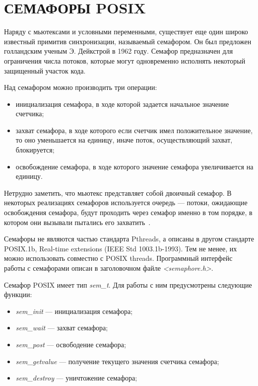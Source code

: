 \section[Семафоры POSIX]{СЕМАФОРЫ POSIX}

Наряду с мьютексами и условными переменными,
существует еще один широко известный примитив синхронизации,
называемый семафором.
Он был предложен голландским ученым Э. Дейкстрой в 1962 году.
Семафор предназначен для ограничения числа потоков,
которые могут одновременно исполнять некоторый защищенный участок кода.

Над семафором можно производить три операции:
\begin{itemize}
  \item инициализация семафора, в ходе которой задается начальное значение счетчика;
  \item захват семафора, в ходе которого если счетчик имел положительное
    значение, то оно уменьшается на единицу, иначе поток, осуществляющий захват, блокируется;
  \item освобождение семафора, в ходе которого значение семафора увеличивается на единицу.
\end{itemize}

Нетрудно заметить, что мьютекс представляет собой двоичный семафор.
В некоторых реализациях семафоров используется очередь --- потоки,
ожидающие освобождения семафора, будут проходить через семафор
именно в том порядке, в котором они вызывали пытались его захватить~\cite{wiki_semaphore}.

Семафоры не являются частью стандарта Pthreads, а описаны в другом стандарте
POSIX.1b, Real-time extensions (IEEE Std 1003.1b-1993).
Тем не менее, их можно использовать совместно с POSIX threads.
Программный интерфейс работы с семафорами описан в заголовочном файле \textit{<semaphore.h>}.

Семафор POSIX имеет тип \textit{sem\_t}. Для работы с ним предусмотрены следующие функции:
\begin{itemize}
\item \textit{sem\_init} --- инициализация семафора;
\item \textit{sem\_wait} --- захват семафора;
\item \textit{sem\_post} --- освободение семафора;
\item \textit{sem\_getvalue} --- получение текущего значения счетчика семафора;
\item \textit{sem\_destroy} --- уничтожение семафора;
\end{itemize}

